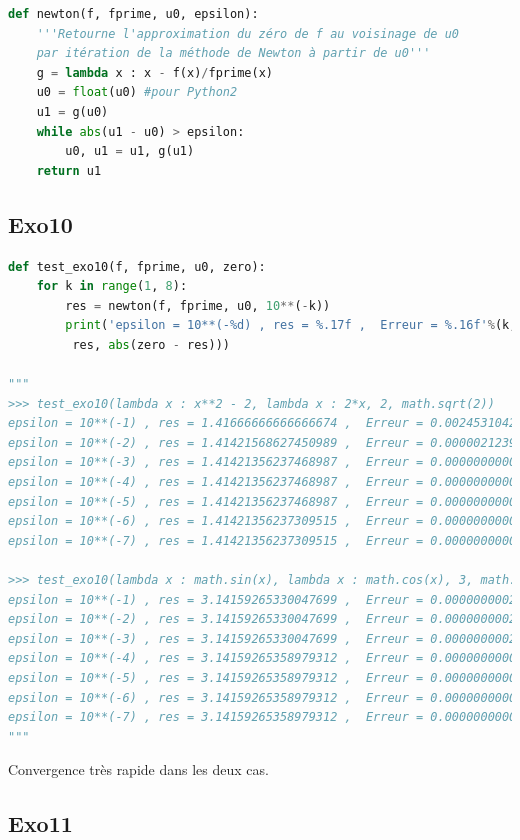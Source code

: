 \documentclass[
  11pt,
]{article}
\newcounter{exo}
\newcounter{def}
\begin{document}
\begin{lstlisting}[language=Python]
def newton(f, fprime, u0, epsilon):
    '''Retourne l'approximation du zéro de f au voisinage de u0
    par itération de la méthode de Newton à partir de u0'''
    g = lambda x : x - f(x)/fprime(x)
    u0 = float(u0) #pour Python2
    u1 = g(u0)
    while abs(u1 - u0) > epsilon:
        u0, u1 = u1, g(u1)
    return u1
\end{lstlisting}

\hypertarget{exo10}{%
\subsection{Exo10}\label{exo10}}

\begin{lstlisting}[language=Python]
def test_exo10(f, fprime, u0, zero):
    for k in range(1, 8):
        res = newton(f, fprime, u0, 10**(-k))
        print('epsilon = 10**(-%d) , res = %.17f ,  Erreur = %.16f'%(k,
         res, abs(zero - res)))

"""
>>> test_exo10(lambda x : x**2 - 2, lambda x : 2*x, 2, math.sqrt(2))
epsilon = 10**(-1) , res = 1.41666666666666674 ,  Erreur = 0.0024531042935716
epsilon = 10**(-2) , res = 1.41421568627450989 ,  Erreur = 0.0000021239014147
epsilon = 10**(-3) , res = 1.41421356237468987 ,  Erreur = 0.0000000000015947
epsilon = 10**(-4) , res = 1.41421356237468987 ,  Erreur = 0.0000000000015947
epsilon = 10**(-5) , res = 1.41421356237468987 ,  Erreur = 0.0000000000015947
epsilon = 10**(-6) , res = 1.41421356237309515 ,  Erreur = 0.0000000000000000
epsilon = 10**(-7) , res = 1.41421356237309515 ,  Erreur = 0.0000000000000000

>>> test_exo10(lambda x : math.sin(x), lambda x : math.cos(x), 3, math.pi)
epsilon = 10**(-1) , res = 3.14159265330047699 ,  Erreur = 0.0000000002893161
epsilon = 10**(-2) , res = 3.14159265330047699 ,  Erreur = 0.0000000002893161
epsilon = 10**(-3) , res = 3.14159265330047699 ,  Erreur = 0.0000000002893161
epsilon = 10**(-4) , res = 3.14159265358979312 ,  Erreur = 0.0000000000000000
epsilon = 10**(-5) , res = 3.14159265358979312 ,  Erreur = 0.0000000000000000
epsilon = 10**(-6) , res = 3.14159265358979312 ,  Erreur = 0.0000000000000000
epsilon = 10**(-7) , res = 3.14159265358979312 ,  Erreur = 0.0000000000000000
"""
\end{lstlisting}

Convergence très rapide dans les deux cas.

\hypertarget{exo11}{%
\subsection{Exo11}\label{exo11}}
\end{document}
